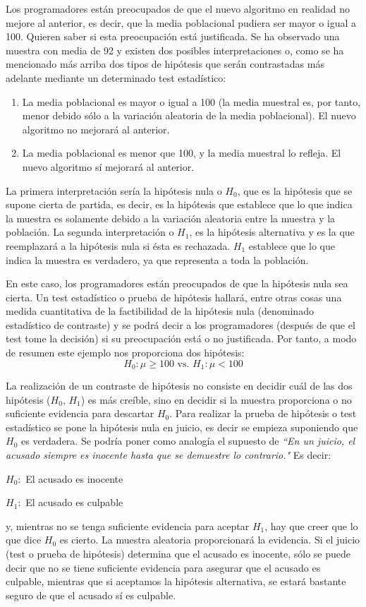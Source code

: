 Los programadores están preocupados de que el nuevo algoritmo en realidad no mejore al anterior, es decir, que
la media poblacional pudiera ser mayor o igual a 100. Quieren saber si esta preocupación está justificada. Se ha
observado una muestra con media de 92 y existen dos posibles interpretaciones o, como se ha mencionado más arriba
dos tipos de hipótesis que serán contrastadas más adelante mediante un determinado test estadístico:
\begin{enumerate}
\item La media poblacional es mayor o igual a 100 (la media muestral es, por tanto, menor debido sólo a la
variación aleatoria de la media poblacional). El nuevo algoritmo no mejorará al anterior.
\item La media poblacional es menor que 100, y la media muestral lo refleja. El nuevo algoritmo sí mejorará
al anterior.
\end{enumerate}
La primera interpretación sería la hipótesis nula o $H_0$, que es la hipótesis que se supone cierta de partida, es
decir, es la hipótesis que establece que lo que indica la muestra es solamente debido a la variación aleatoria entre
la muestra y la población. La segunda interpretación o $H_1$, es la hipótesis alternativa y es la que reemplazará a
la hipótesis nula si ésta es rechazada. $H_1$ establece que lo que indica la muestra es verdadero, ya que representa
a toda la población.

En este caso, los programadores están preocupados de que la hipótesis nula sea cierta. Un test estadístico o prueba
de hipótesis hallará, entre otras cosas  una medida cuantitativa de la factibilidad de la hipótesis nula (denominado estadístico de contraste) y se podrá decir a los programadores (después de que el test tome la decisión) si su
preocupación está o no justificada. Por tanto, a modo de resumen este ejemplo nos proporciona dos hipótesis:
$$H_0: \mu \geq 100 \mbox{ vs. } H_1: \mu < 100$$

La realización de un contraste de hipótesis no consiste en decidir cuál de las dos hipótesis ($H_0$, $H_1$) es más
creíble, sino en decidir si la muestra proporciona o no suficiente evidencia para descartar $H_0$. Para realizar la
prueba de hipótesis o test estadístico se pone la hipótesis nula en juicio, es decir se empieza suponiendo que $H_0$
es verdadera. Se podría poner como analogía el supuesto de \textit{``En un juicio, el acusado siempre es inocente
hasta que se demuestre lo contrario."} Es decir:
\begin{center}
$H_0:$ El acusado es inocente

$H_1:$ El acusado es culpable
\end{center}
y, mientras no se tenga suficiente evidencia para aceptar $H_1$, hay que creer que lo que dice $H_0$ es cierto. La
muestra aleatoria proporcionará la evidencia. Si el juicio (test o prueba de hipótesis) determina que el acusado
es inocente, sólo se puede decir que no se tiene suficiente evidencia para asegurar que el acusado es culpable,
mientras que si aceptamos la hipótesis alternativa, se estará bastante seguro de que el acusado sí es culpable.

